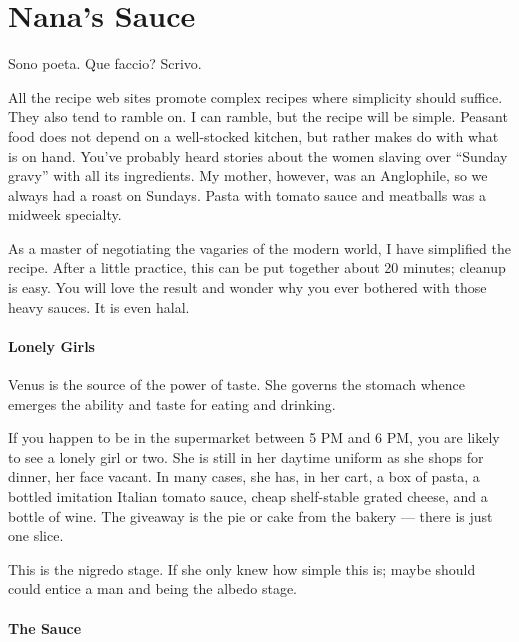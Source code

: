 \section{Nana’s Sauce}

\begin{quotex}
Sono poeta. Que faccio? Scrivo.
\end{quotex}


All the recipe web sites promote complex recipes where simplicity should suffice. They also tend to ramble on. I can ramble, but the recipe will be simple. Peasant food does not depend on a well-stocked kitchen, but rather makes do with what is on hand. You've probably heard stories about the women slaving over ``Sunday gravy'' with all its ingredients. My mother, however, was an Anglophile, so we always had a roast on Sundays. Pasta with tomato sauce and meatballs was a midweek specialty.

As a master of negotiating the vagaries of the modern world, I have simplified the recipe. After a little practice, this can be put together about 20 minutes; cleanup is easy. You will love the result and wonder why you ever bothered with those heavy sauces. It is even halal.

\paragraph{Lonely Girls}


\begin{quotex}
Venus is the source of the power of taste. She governs the stomach whence emerges the ability and taste for eating and drinking.
\end{quotex}


If you happen to be in the supermarket between 5 PM and 6 PM, you are likely to see a lonely girl or two. She is still in her daytime uniform as she shops for dinner, her face vacant. In many cases, she has, in her cart, a box of pasta, a bottled imitation Italian tomato sauce, cheap shelf-stable grated cheese, and a bottle of wine. The giveaway is the pie or cake from the bakery --- there is just one slice.

This is the nigredo stage. If she only knew how simple this is; maybe should could entice a man and being the albedo stage.

\paragraph{The Sauce}


